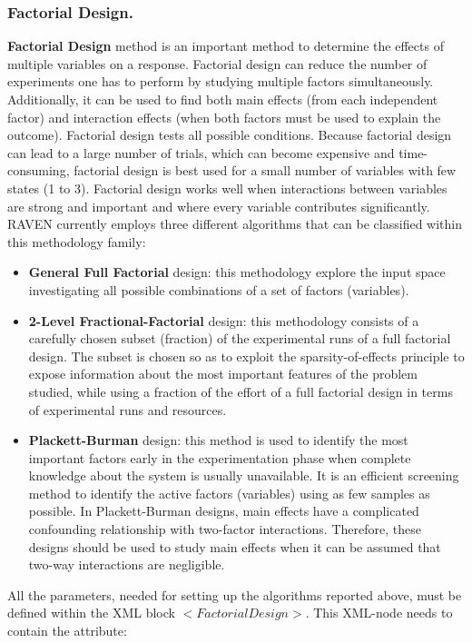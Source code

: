 \subsubsection{Factorial Design.}
\label{subsubsubsec:FactorialDOE}
\textbf{Factorial Design} method is an important method to determine the effects of multiple variables on a response. Factorial design can reduce the number of experiments one has to perform by studying multiple factors simultaneously. Additionally, it can be used to find both main effects (from each independent factor) and interaction effects (when both factors must be used to explain the outcome).
Factorial design tests all possible conditions. Because factorial design can lead to a large number of trials, which can become expensive and time-consuming, factorial design is best used for a small number of variables with few states (1 to 3). Factorial design works well when interactions between variables are strong and important and where every variable contributes significantly. RAVEN currently  employs three different algorithms that can be classified within this methodology family:
\begin{itemize}
 \item \textbf{General Full Factorial} design: this methodology  explore the input space investigating  all possible combinations of a set of factors (variables).
 \item \textbf{2-Level Fractional-Factorial} design: this methodology consists of a carefully chosen subset (fraction) of the experimental runs of a full factorial design. The subset is chosen so as to exploit the sparsity-of-effects principle to expose information about the most important features of the problem studied, while using a fraction of the effort of a full factorial design in terms of experimental runs and resources.
\item \textbf{Plackett-Burman } design: this method is used to identify the most important factors early in the experimentation phase when complete knowledge about the system is usually unavailable. It is an efficient screening method to identify the active factors (variables) using as few samples as possible.
In Plackett-Burman designs, main effects have a complicated confounding relationship with two-factor interactions. Therefore, these designs should be used to study main effects when it can be assumed that two-way interactions are negligible.
\end{itemize}
All the parameters, needed for setting up the algorithms reported above, must be defined within the XML block $<FactorialDesign>$. This XML-node needs to contain the attribute:
